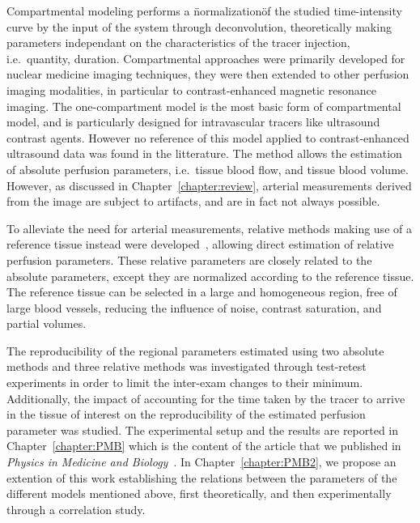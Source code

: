 Compartmental modeling performs a \"normalization\" of the studied time-intensity curve by the input of the system through deconvolution, theoretically making parameters independant on the characteristics of the tracer injection, i.e.~quantity, duration.
Compartmental approaches were primarily developed for nuclear medicine imaging techniques, they were then extended to other perfusion imaging modalities, in particular to contrast-enhanced magnetic resonance imaging.
The one-compartment model is the most basic form of compartmental model, and is particularly designed for intravascular tracers like ultrasound contrast agents. 
However no reference of this model applied to contrast-enhanced ultrasound data was found in the litterature.
The method allows the estimation of absolute perfusion parameters, i.e.~tissue blood flow, and tissue blood volume.
However, as discussed in Chapter~\ref{chapter:review}, arterial measurements derived from the image are subject to artifacts, and are in fact not always possible.

To alleviate the need for arterial measurements, relative methods making use of a reference tissue instead were developed~\cite{Yankeelov:2005dea}, allowing direct estimation of relative perfusion parameters.
These relative parameters are closely related to the absolute parameters, except they are normalized according to the reference tissue.
The reference tissue can be selected in a large and homogeneous region, free of large blood vessels, reducing the influence of noise, contrast saturation, and partial volumes.

The reproducibility of the regional parameters estimated using two absolute methods and three relative methods was investigated through test-retest experiments in order to limit the inter-exam changes to their minimum.
Additionally, the impact of accounting for the time taken by the tracer to arrive in the tissue of interest on the reproducibility of the estimated perfusion parameter was studied. 
The experimental setup and the results are reported in Chapter~\ref{chapter:PMB} which is the content of the article that we published in {\em Physics in Medicine and Biology}~\cite{Doury:2017fz}.
In Chapter~\ref{chapter:PMB2}, we propose an extention of this work establishing the relations between the parameters of the different models mentioned above, first theoretically, and then experimentally through a correlation study.
